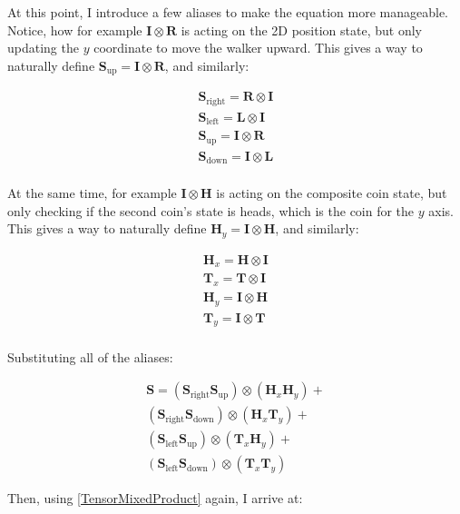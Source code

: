 At this point, I introduce a few aliases to make the equation more manageable. Notice, how for example $\mathbf{I} \otimes \mathbf{R}$ is acting on the 2D position state, but only updating the $y$ coordinate to move the walker upward. This
gives a way to naturally define $\mathbf{S}_{\text{up}} = \mathbf{I} \otimes \mathbf{R}$, and similarly:

\begin{align*} 
\mathbf{S}_{\text{right}} = \mathbf{R} \otimes \mathbf{I} \\
\mathbf{S}_{\text{left}} = \mathbf{L} \otimes \mathbf{I} \\
\mathbf{S}_{\text{up}} = \mathbf{I} \otimes \mathbf{R} \\
\mathbf{S}_{\text{down}} = \mathbf{I} \otimes \mathbf{L} \\
\end{align*}

At the same time, for example $\mathbf{I} \otimes \mathbf{H}$ is acting on the composite coin state, but only checking if the second coin's state is heads, which is the coin for the $y$ axis. This gives a way to naturally define $\mathbf{H}_y = \mathbf{I} \otimes \mathbf{H}$, and similarly:

\begin{align*} 
\mathbf{H}_x = \mathbf{H} \otimes \mathbf{I} \\
\mathbf{T}_x = \mathbf{T} \otimes \mathbf{I} \\
\mathbf{H}_y = \mathbf{I} \otimes \mathbf{H} \\
\mathbf{T}_y = \mathbf{I} \otimes \mathbf{T} \\
\end{align*}

Substituting all of the aliases:

\begin{align*} 
    \mathbf{S} =   
    (\mathbf{S}_{\text{right}}\mathbf{S}_{\text{up}}) \otimes (\mathbf{H}_x\mathbf{H}_y) + \\
    (\mathbf{S}_{\text{right}}\mathbf{S}_{\text{down}}) \otimes (\mathbf{H}_x\mathbf{T}_y) + \\
    (\mathbf{S}_{\text{left}}\mathbf{S}_{\text{up}}) \otimes (\mathbf{T}_x\mathbf{H}_y) + \\
    (\mathbf{S}_{\text{left}}\mathbf{S}_{\text{down}}) \otimes (\mathbf{T}_x\mathbf{T}_y)\phantom{+}
\end{align*}

Then, using \hyperref[TensorMixedProduct]{[TensorMixedProduct]} again, I arrive at:

